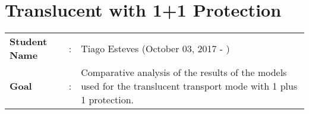 \clearpage

\section{Translucent with 1+1 Protection}\label{comparative_Transluc_Protection}
\begin{tcolorbox}	
\begin{tabular}{p{2.75cm} p{0.2cm} p{10.5cm}} 	
\textbf{Student Name}  &:& Tiago Esteves    (October 03, 2017 - )\\
\textbf{Goal}          &:& Comparative analysis of the results of the models used for the translucent transport mode with 1 plus 1 protection.
\end{tabular}
\end{tcolorbox}
\vspace{11pt}

